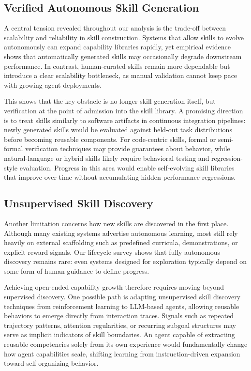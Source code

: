 \documentclass[conference, compsoc]{IEEEtran}
\theoremstyle{plain}
\begin{document}
{\subsection{Verified Autonomous Skill Generation}
\label{sec:open:verified}

A central tension revealed throughout our analysis is the trade-off between scalability and reliability in skill construction. Systems that allow skills to evolve autonomously can expand capability libraries rapidly, yet empirical evidence shows that automatically generated skills may occasionally degrade downstream performance. In contrast, human-curated skills remain more dependable but introduce a clear scalability bottleneck, as manual validation cannot keep pace with growing agent deployments. 

This shows that the key obstacle is no longer skill generation itself, but verification at the point of admission into the skill library. A promising direction is to treat skills similarly to software artifacts in continuous integration pipelines: newly generated skills would be evaluated against held-out task distributions before becoming reusable components. For code-centric skills, formal or semi-formal verification techniques may provide guarantees about behavior, while natural-language or hybrid skills likely require behavioral testing and regression-style evaluation. Progress in this area would enable self-evolving skill libraries that improve over time without accumulating hidden performance regressions.


\subsection{Unsupervised Skill Discovery}
\label{sec:open:discovery}

Another limitation concerns how new skills are discovered in the first place. Although many existing systems advertise autonomous learning, most still rely heavily on external scaffolding such as predefined curricula, demonstrations, or explicit reward signals. Our lifecycle survey shows that fully autonomous discovery remains rare: even systems designed for exploration typically depend on some form of human guidance to define progress.

Achieving open-ended capability growth therefore requires moving beyond supervised discovery. One possible path is adapting unsupervised skill discovery techniques from reinforcement learning to LLM-based agents, allowing reusable behaviors to emerge directly from interaction traces. Signals such as repeated trajectory patterns, attention regularities, or recurring subgoal structures may serve as implicit indicators of skill boundaries. An agent capable of extracting reusable competencies solely from its own experience would fundamentally change how agent capabilities scale, shifting learning from instruction-driven expansion toward self-organizing behavior.


}
\end{document}
